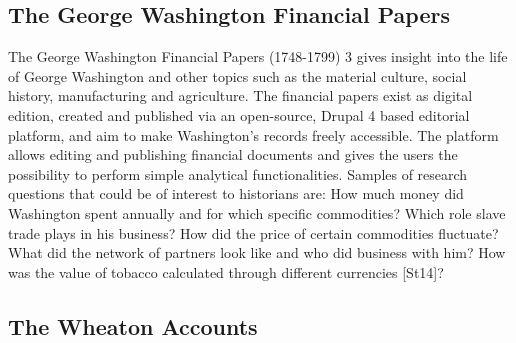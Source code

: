 \documentclass[12pt,a4paper]{article}
\begin{document}
\subsection{The George Washington Financial Papers}
The George Washington Financial Papers (1748-1799) 3 gives insight into the life of
George Washington and other topics such as the material culture, social history,
manufacturing and agriculture. The financial papers exist as digital edition, created and
published via an open-source, Drupal 4 based editorial platform, and aim to make
Washington’s records freely accessible. The platform allows editing and publishing
financial documents and gives the users the possibility to perform simple analytical
functionalities. Samples of research questions that could be of interest to historians are:
How much money did Washington spent annually and for which specific commodities?
Which role slave trade plays in his business? How did the price of certain commodities
fluctuate? What did the network of partners look like and who did business with him?
How was the value of tobacco calculated through different currencies [St14]?

\subsection{The Wheaton Accounts}
\end{document}
